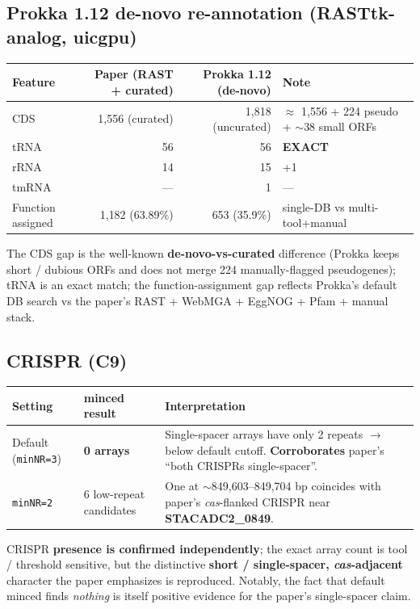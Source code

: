 \documentclass[11pt]{article}
\begin{document}
\subsection{Prokka 1.12 de-novo re-annotation (RASTtk-analog, uicgpu)}

\begin{longtable}{lrrl}
\toprule
Feature & Paper (RAST + curated) & Prokka 1.12 (de-novo) & Note \\
\midrule
\endhead
CDS & 1{,}556 (curated) & 1{,}818 (uncurated) & $\approx$ 1{,}556 + 224 pseudo + $\sim$38 small ORFs \\
tRNA & 56 & 56 & \textbf{EXACT} \\
rRNA & 14 & 15 & +1 \\
tmRNA & --- & 1 & --- \\
Function assigned & 1{,}182 (63.89\%) & 653 (35.9\%) & single-DB vs multi-tool+manual \\
\bottomrule
\end{longtable}

The CDS gap is the well-known \textbf{de-novo-vs-curated} difference (Prokka keeps short / dubious
ORFs and does not merge 224 manually-flagged pseudogenes); tRNA is an exact match; the
function-assignment gap reflects Prokka's default DB search vs the paper's RAST + WebMGA + EggNOG
+ Pfam + manual stack.

\subsection{CRISPR (C9)}

\begin{longtable}{lll}
\toprule
Setting & minced result & Interpretation \\
\midrule
\endhead
Default (\texttt{minNR=3}) & \textbf{0 arrays} & Single-spacer arrays have only 2 repeats
$\rightarrow$ below default cutoff. \textbf{Corroborates} paper's ``both CRISPRs single-spacer''. \\
\texttt{minNR=2} & 6 low-repeat candidates & One at $\sim$849{,}603--849{,}704 bp coincides with
paper's \emph{cas}-flanked CRISPR near \textbf{STACADC2\_0849}. \\
\bottomrule
\end{longtable}

CRISPR \textbf{presence is confirmed independently}; the exact array count is tool / threshold
sensitive, but the distinctive \textbf{short / single-spacer, \emph{cas}-adjacent} character the
paper emphasizes is reproduced. Notably, the fact that default minced finds \emph{nothing} is
itself positive evidence for the paper's single-spacer claim.
\end{document}
